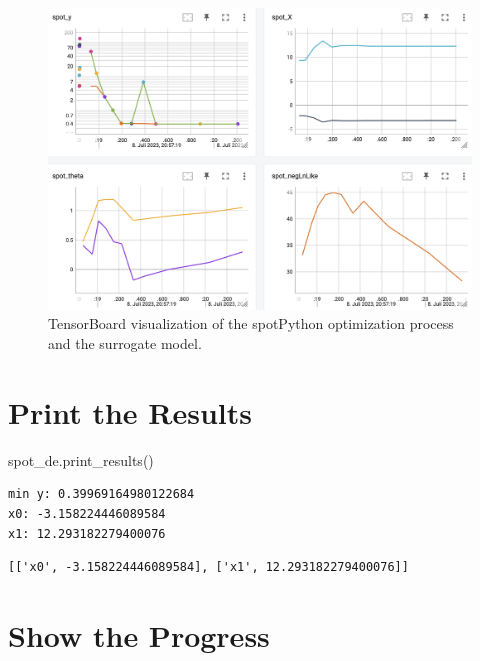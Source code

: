 \documentclass[
  letterpaper,
  DIV=11,
  numbers=noendperiod]{scrreprt}
\newenvironment{Shaded}{\begin{snugshade}}{\end{snugshade}}
\newcommand{\NormalTok}[1]{\textcolor[rgb]{0.00,0.23,0.31}{#1}}
\begin{document}
\begin{figure}

{\centering \includegraphics[width=1\textwidth,height=\textheight]{figures_static/05_tensorboard_01.png}

}

\caption{TensorBoard visualization of the spotPython optimization
process and the surrogate model.}

\end{figure}

\hypertarget{print-the-results}{%
\section{Print the Results}\label{print-the-results}}

\begin{Shaded}
\begin{Highlighting}[]
\NormalTok{spot\_de.print\_results()}
\end{Highlighting}
\end{Shaded}

\begin{verbatim}
min y: 0.39969164980122684
x0: -3.158224446089584
x1: 12.293182279400076
\end{verbatim}

\begin{verbatim}
[['x0', -3.158224446089584], ['x1', 12.293182279400076]]
\end{verbatim}

\hypertarget{show-the-progress}{%
\section{Show the Progress}\label{show-the-progress}}
\end{document}
